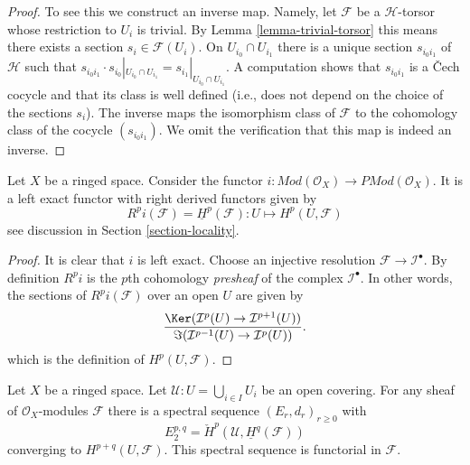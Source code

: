 \begin{proof}
To see this we construct an inverse map. Namely, let $\mathcal{F}$ be a
$\mathcal{H}$-torsor whose restriction to $U_i$ is trivial. By
Lemma \ref{lemma-trivial-torsor} this means there
exists a section $s_i \in \mathcal{F}(U_i)$. On $U_{i_0} \cap U_{i_1}$
there is a unique section $s_{i_0i_1}$ of $\mathcal{H}$ such that
$s_{i_0i_1} \cdot s_{i_0}|_{U_{i_0} \cap U_{i_1}} =
s_{i_1}|_{U_{i_0} \cap U_{i_1}}$. A computation shows
that $s_{i_0i_1}$ is a {\v C}ech cocycle and that its class is well
defined (i.e., does not depend on the choice of the sections $s_i$).
The inverse maps the isomorphism class of $\mathcal{F}$ to the cohomology
class of the cocycle $(s_{i_0i_1})$.
We omit the verification that this map is indeed an inverse.
\end{proof}

\begin{lemma}
\label{lemma-include}
Let $X$ be a ringed space.
Consider the functor
$i : \textit{Mod}(\mathcal{O}_X) \to \textit{PMod}(\mathcal{O}_X)$.
It is a left exact functor with right derived functors given by
$$
R^pi(\mathcal{F}) = \underline{H}^p(\mathcal{F}) :
U \longmapsto H^p(U, \mathcal{F})
$$
see discussion in Section \ref{section-locality}.
\end{lemma}

\begin{proof}
It is clear that $i$ is left exact.
Choose an injective resolution $\mathcal{F} \to \mathcal{I}^\bullet$.
By definition $R^pi$ is the $p$th cohomology {\it presheaf}
of the complex $\mathcal{I}^\bullet$. In other words, the
sections of $R^pi(\mathcal{F})$ over an open $U$ are given by
$$
\frac{\Ker(\mathcal{I}^p(U) \to \mathcal{I}^{p + 1}(U))}
{\Im(\mathcal{I}^{p - 1}(U) \to \mathcal{I}^p(U))}.
$$
which is the definition of $H^p(U, \mathcal{F})$.
\end{proof}

\begin{lemma}
\label{lemma-cech-spectral-sequence}
Let $X$ be a ringed space.
Let $\mathcal{U} : U = \bigcup_{i \in I} U_i$ be an open covering.
For any sheaf of $\mathcal{O}_X$-modules $\mathcal{F}$ there
is a spectral sequence $(E_r, d_r)_{r \geq 0}$ with
$$
E_2^{p, q} = \check{H}^p(\mathcal{U}, \underline{H}^q(\mathcal{F}))
$$
converging to $H^{p + q}(U, \mathcal{F})$.
This spectral sequence is functorial in $\mathcal{F}$.
\end{lemma}

